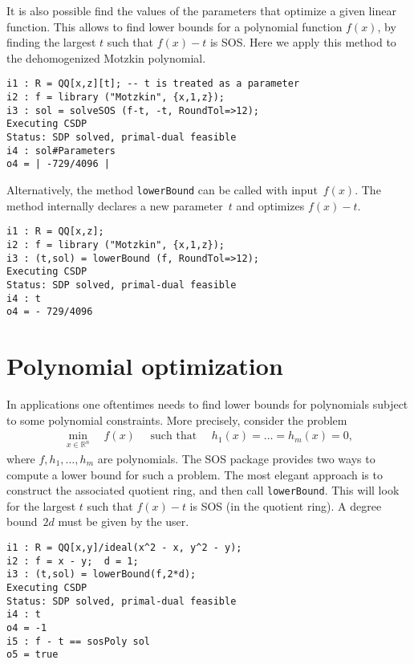 \documentclass[11pt]{amsart}
\theoremstyle{plain}%
\theoremstyle{definition}
\theoremstyle{remark}
\newcommand{\SOS}{\textsc{SOS}\xspace}
\newcommand{\RR}{\mathbb{R}}
\begin{document}
It is also possible find the values of the parameters that optimize a given linear function.
This allows to find lower bounds for a polynomial function $f(x)$,
by finding the largest $t$ such that $f(x)-t$ is SOS.
Here we apply this method to the dehomogenized Motzkin polynomial.

{\small
\begin{verbatim}
i1 : R = QQ[x,z][t]; -- t is treated as a parameter
i2 : f = library ("Motzkin", {x,1,z});
i3 : sol = solveSOS (f-t, -t, RoundTol=>12);
Executing CSDP
Status: SDP solved, primal-dual feasible
i4 : sol#Parameters
o4 = | -729/4096 |
\end{verbatim}
}

\noindent
Alternatively, the method \verb|lowerBound| can be called with input~$f(x)$.
The method internally declares a new parameter~$t$ and optimizes $f(x)-t$.
{\small
\begin{verbatim}
i1 : R = QQ[x,z];
i2 : f = library ("Motzkin", {x,1,z});
i3 : (t,sol) = lowerBound (f, RoundTol=>12);
Executing CSDP
Status: SDP solved, primal-dual feasible
i4 : t
o4 = - 729/4096
\end{verbatim}
}

\section{Polynomial optimization}

In applications one oftentimes needs to find lower bounds for polynomials subject to some polynomial constraints.
More precisely, consider the problem
\begin{align*}
  \min_{x\in \RR^n} \quad f(x)
  \quad \text{ such that }\quad
  h_1(x)=\dots=h_m(x)=0,
\end{align*}
where $f, h_1,\dots,h_m$ are polynomials.
The \SOS package provides two ways to compute a lower bound for such a problem.
The most elegant approach is to construct the associated quotient ring, and then call \verb|lowerBound|.
This will look for the largest $t$ such that $f(x)-t$ is SOS (in the quotient ring).
A degree bound~$2d$ must be given by the user.

{\small
\begin{verbatim}
i1 : R = QQ[x,y]/ideal(x^2 - x, y^2 - y);
i2 : f = x - y;  d = 1;
i3 : (t,sol) = lowerBound(f,2*d);
Executing CSDP
Status: SDP solved, primal-dual feasible
i4 : t
o4 = -1
i5 : f - t == sosPoly sol
o5 = true
\end{verbatim}
}
\end{document}
